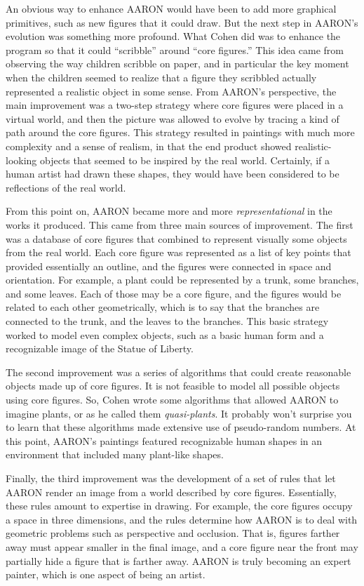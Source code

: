 An obvious way to enhance AARON would have been to add more graphical
primitives, such as new figures that it could draw. But
the next step in AARON's evolution was something more profound. What
Cohen did was to enhance the program so that it could ``scribble'' around
``core figures.'' This idea came from observing the way children
scribble on paper, and in particular the key moment when the children
seemed to realize that a figure they scribbled actually represented a
realistic object in some sense. From AARON's perspective, the main improvement
was a two-step strategy where core figures 
were placed in a virtual world,
and then the picture was allowed to evolve by tracing a kind of path
around the core figures. 
This strategy resulted in paintings with much more complexity
and a sense of realism, in that the end product showed realistic-looking
objects that seemed to be inspired by the real world. Certainly, if a
human artist had drawn these shapes, they would have been considered to be
reflections of the real world.

From this point on, AARON became more and more \emph{representational} in
the works it produced. This came from three main sources of improvement. The first
was a database of core figures that combined to represent visually some
objects from the real world. Each core figure was represented as a list of
key points that provided essentially an outline, and the figures were connected
in space and orientation.
For example, a plant could be represented by
a trunk, some branches, and some leaves. Each of those may be a core figure,
and the figures would be related to each other geometrically, which is to say
that the branches are connected to the trunk, and the leaves to the branches.
This basic strategy worked to model even complex objects, such as a basic human
form and a recognizable image of the Statue of Liberty.

The second improvement was a series of algorithms that could create reasonable
objects made up of core figures. It is not feasible to model all possible
objects using core figures. So, Cohen wrote some algorithms that allowed AARON to
imagine plants, 
or as he called them \emph{quasi-plants}. It probably won't surprise
you to learn that these algorithms made extensive use of pseudo-random numbers. 
At this point, AARON's paintings featured recognizable human shapes 
in an environment that included many plant-like shapes.

Finally, the third improvement was the development of a set of rules that
let AARON render an image from a world described by core figures. Essentially,
these rules amount to expertise in drawing. For example, the core figures occupy
a space in three dimensions, and the rules determine how AARON is to deal with
geometric problems such as perspective and occlusion. That is, figures farther
away must appear smaller in the final image, and a core figure near the front may
partially hide a figure that is farther away. AARON is truly becoming an expert
painter, which is one aspect of being an artist.

